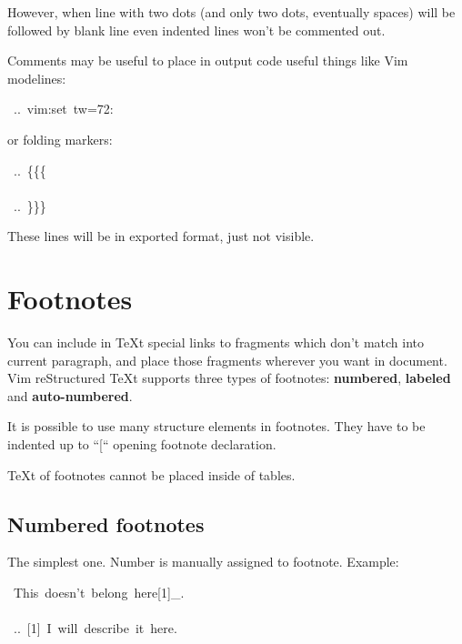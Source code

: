 \documentclass[12pt]{article}
\begin{document}
However, when line with two dots (and only two dots, eventually spaces) will
be followed by blank line even indented lines won't be commented out.

Comments may be useful to place in output code useful things like Vim
modelines:

\begin{ttfamily}\begin{flushleft}
\mbox{~..~vim:set~tw=72:}\\
\end{flushleft}\end{ttfamily}

or folding markers:

\begin{ttfamily}\begin{flushleft}
\mbox{~..~\{\{\{}\\
\mbox{}\\
\mbox{~..~\}\}\}}\\
\end{flushleft}\end{ttfamily}

These lines will be in exported format, just not visible.

\hypertarget{lfootnotes}{}
\section{Footnotes}

You can include in \TeX{}t special links to fragments which don't match
into current paragraph, and place those fragments wherever you want in
document. Vim reStructured \TeX{}t supports three types of footnotes: \textbf{numbered}, \textbf{labeled}
and \textbf{auto-numbered}.

It is possible to use many structure elements in footnotes. They have to be
indented up to ``[`` opening footnote declaration.

\TeX{}t of footnotes cannot be placed inside of tables.

\hypertarget{lnumbered-footnotes}{}
\subsection{Numbered footnotes}

The simplest one. Number is manually assigned to footnote. Example:

\begin{ttfamily}\begin{flushleft}
\mbox{~This~doesn't~belong~here[1]\_.}\\
\mbox{}\\
\mbox{~..~[1]~I~will~describe~it~here.}\\
\end{flushleft}\end{ttfamily}
\end{document}
